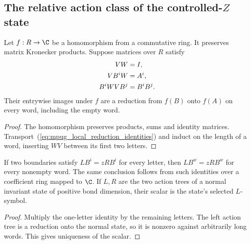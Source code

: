 \subsection{The relative action class of the controlled-$Z$ state}

\begin{lemma}
    \label{lem:mpug_reduction_coefficient_map}
    \leanok
    Let $f:R\to\C$ be a homomorphism from a commutative ring. It preserves
    matrix Kronecker products. Suppose matrices over $R$ satisfy
    \begin{align}
        VW       & =I,\notag   \\
        VB^iW    & =A^i,\notag \\
        B^iWVB^j & =B^iB^j.
        \label{eq:mpug_local_reduction_identities}
    \end{align}
    Their entrywise images under $f$ are a reduction from $f(B)$ onto
    $f(A)$ on every word, including the empty word.
\end{lemma}
\begin{proof}\leanok
    The homomorphism preserves products, sums and identity matrices.
    Transport~(\ref{eq:mpug_local_reduction_identities}) and induct on the length of a word,
    inserting $WV$ between its first two letters.
\end{proof}

\begin{lemma}
    \label{lem:mpug_action_scalar_local}
    \leanok
    If two boundaries satisfy $LB^i=zRB^i$ for every letter, then
    $LB^w=zRB^w$ for every nonempty word. The same conclusion follows from
    such identities over a coefficient ring mapped to $\C$.
    If $L,R$ are the two action trees of a normal invariant state of positive
    bond dimension, their scalar is the state's selected $L$-symbol.
\end{lemma}
\begin{proof}\leanok
    Multiply the one-letter identity by the remaining letters. The left
    action tree is a reduction onto the normal state, so it is nonzero
    against arbitrarily long words. This gives uniqueness of the scalar.
\end{proof}

